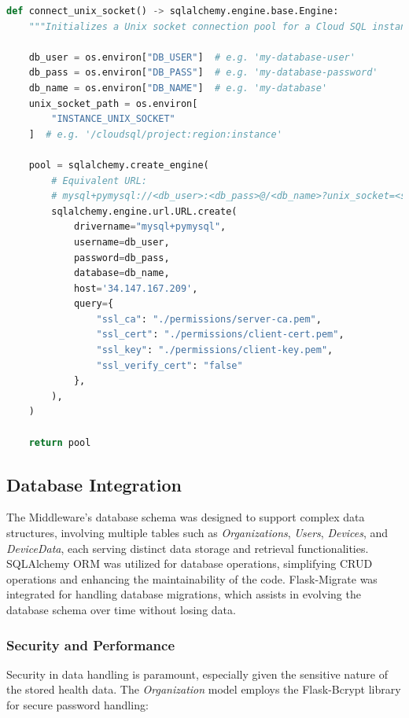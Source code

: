 \begin{lstlisting}[language=python, caption={Connection to Google Cloud MySQL using unix socket} label={lst:unix-socket}]
def connect_unix_socket() -> sqlalchemy.engine.base.Engine:
    """Initializes a Unix socket connection pool for a Cloud SQL instance of MySQL."""

    db_user = os.environ["DB_USER"]  # e.g. 'my-database-user'
    db_pass = os.environ["DB_PASS"]  # e.g. 'my-database-password'
    db_name = os.environ["DB_NAME"]  # e.g. 'my-database'
    unix_socket_path = os.environ[
        "INSTANCE_UNIX_SOCKET"
    ]  # e.g. '/cloudsql/project:region:instance'

    pool = sqlalchemy.create_engine(
        # Equivalent URL:
        # mysql+pymysql://<db_user>:<db_pass>@/<db_name>?unix_socket=<socket_path>/<cloud_sql_instance_name>
        sqlalchemy.engine.url.URL.create(
            drivername="mysql+pymysql",
            username=db_user,
            password=db_pass,
            database=db_name,
            host='34.147.167.209',
            query={
                "ssl_ca": "./permissions/server-ca.pem",
                "ssl_cert": "./permissions/client-cert.pem",
                "ssl_key": "./permissions/client-key.pem",
                "ssl_verify_cert": "false"
            },
        ),
    )

    return pool
\end{lstlisting}


\subsection{Database Integration}
The Middleware's database schema was designed to support complex data structures, involving multiple tables such as \textit{Organizations}, \textit{Users}, \textit{Devices}, and \textit{DeviceData}, each serving distinct data storage and retrieval functionalities. SQLAlchemy ORM was utilized for database operations, simplifying CRUD operations and enhancing the maintainability of the code. Flask-Migrate was integrated for handling database migrations, which assists in evolving the database schema over time without losing data.


\subsubsection{Security and Performance}
Security in data handling is paramount, especially given the sensitive nature of the stored health data. The \textit{Organization} model employs the Flask-Bcrypt library for secure password handling:

